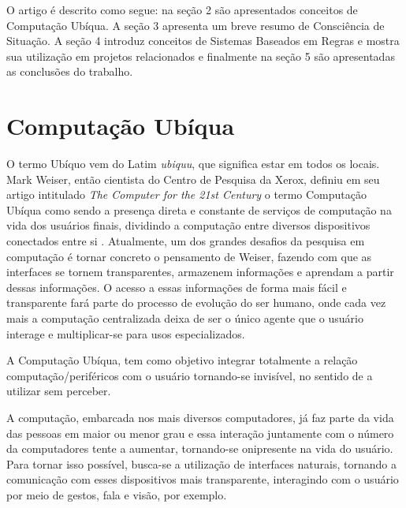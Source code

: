 \documentclass[12pt,a4paper,compsoc]{IEEEtran}
\begin{document}
  O artigo é descrito como segue: na seção 2 são apresentados conceitos de Computação Ubíqua. A
  seção 3 apresenta um breve resumo de Consciência de Situação. A seção 4 introduz conceitos de
  Sistemas Baseados em Regras e mostra sua utilização em projetos relacionados e finalmente na
  seção 5 são apresentadas as conclusões do trabalho.


\section{Computação Ubíqua}

  O termo Ubíquo vem do Latim \textit{ubiquu}, que significa estar em todos os locais. Mark Weiser,
  então cientista do Centro de Pesquisa da Xerox, definiu em seu artigo intitulado  \textit{The
  Computer for the 21st Century} o termo Computação Ubíqua como sendo a presença direta e constante
  de serviços de computação na vida dos usuários finais, dividindo a computação entre diversos
  dispositivos conectados entre si \cite{weiser1991}. Atualmente, um dos grandes desafios da
  pesquisa em computação é tornar concreto o pensamento de Weiser, fazendo com que as interfaces se
  tornem transparentes, armazenem informações e aprendam a partir dessas informações. O acesso a
  essas informações de forma mais fácil e transparente fará parte do processo de evolução do ser
  humano, onde cada vez mais a computação centralizada deixa de ser o único agente que o usuário
  interage e multiplicar-se para usos especializados. 
  
  A Computação Ubíqua, tem como  objetivo integrar totalmente a relação computação/periféricos com
  o usuário tornando-se invisível, no sentido de a utilizar sem perceber.
  
  A computação, embarcada nos mais diversos computadores, já faz parte da vida das pessoas em maior
  ou menor grau e essa interação juntamente com o número da computadores tente a aumentar,
  tornando-se onipresente na vida do usuário. Para tornar isso possível, busca-se a utilização de
  interfaces naturais, tornando a comunicação com esses dispositivos mais transparente, interagindo
  com o usuário por meio de gestos, fala e visão, por exemplo.
  
\end{document}
